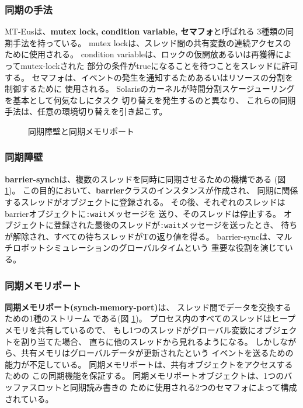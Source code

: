 \subsubsection{同期の手法}
MT-Eusは、{\bf mutex lock, condition variable, セマフォ}と呼ばれる
3種類の同期手法を持っている。
mutex lockは、スレッド間の共有変数の連続アクセスのために使用される。
condition variableは、ロックの仮開放あるいは再獲得によってmutex-lockされた
部分の条件がtrueになることを待つことをスレッドに許可する。
セマフォは、イベントの発生を通知するためあるいはリソースの分割を制御するために
使用される。
Solarisのカーネルが時間分割スケージューリングを基本として何気なしにタスク
切り替えを発生するのと異なり、
これらの同期手法は、任意の環境切り替えを引き起こす。

\begin{figure}
\begin{center}
\caption{同期障壁と同期メモリポート}
\label{synchports}
\end{center}
\end{figure}

\subsubsection{同期障壁}
{\bf barrier-synch}は、複数のスレッドを同時に同期させるための機構である
(図 \ref{synchports})。
この目的において、{\bf barrier}クラスのインスタンスが作成され、
同期に関係するスレッドがオブジェクトに登録される。
その後、それぞれのスレッドはbarrierオブジェクトに{\tt :wait}メッセージを
送り、そのスレッドは停止する。
オブジェクトに登録された最後のスレッドが{\tt :wait}メッセージを送ったとき、
待ちが解除され、すべての待ちスレッドがTの返り値を得る。
barrier-syncは、マルチロボットシミュレーションのグローバルタイムという
重要な役割を演じている。

\subsubsection{同期メモリポート}
{\bf 同期メモリポート(synch-memory-port)}は、
スレッド間でデータを交換するための1種のストリーム
である(図 \ref{synchports})。
プロセス内のすべてのスレッドはヒープメモリを共有しているので、
もし1つのスレッドがグローバル変数にオブジェクトを割り当てた場合、
直ちに他のスレッドから見れるようになる。
しかしながら、共有メモリはグローバルデータが更新されたという
イベントを送るための能力が不足している。
同期メモリポートは、共有オブジェクトをアクセスするための
この同期機能を保証する。
同期メモリポートオブジェクトは、1つのバッファスロットと同期読み書きの
ために使用される2つのセマフォによって構成されている。

